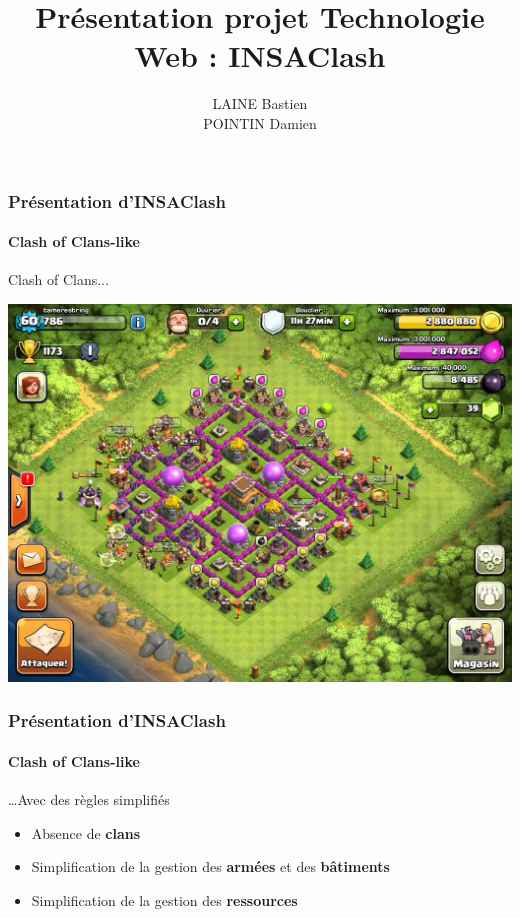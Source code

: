 \documentclass[aspectratio=169]{beamer}
\title{Pr\'esentation projet Technologie Web : INSAClash}
\author{LAINE Bastien \\POINTIN Damien}
\institute{G\'enie Math\'ematique - INSA Rouen}
\begin{document}
    \begin{frame}
    \titlepage
    \end{frame}

    \begin{frame}
        \frametitle{Pr\'esentation d'INSAClash}
        \framesubtitle{Clash of Clans-like}
        Clash of Clans...
        \begin{center}
            \includegraphics[scale=0.2]{images/clashOfClan.jpg}
        \end{center}
    \end{frame}

    \begin{frame}
        \frametitle{Pr\'esentation d'INSAClash}
        \framesubtitle{Clash of Clans-like}
        \ldots Avec des règles simplifi\'es
        \begin{itemize}
            \item Absence de \textbf{clans}
            \item Simplification de la gestion des \textbf{arm\'ees} et des \textbf{bâtiments}
            \item Simplification de la gestion des \textbf{ressources}
        \end{itemize}
    \end{frame}
\end{document}
